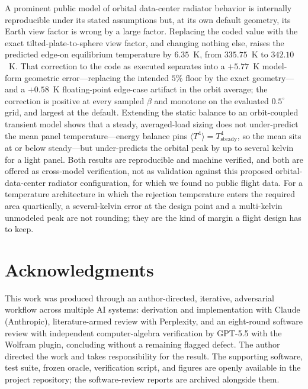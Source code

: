 \documentclass[11pt]{article}
\theoremstyle{remark}
\begin{document}
A prominent public model of orbital data-center radiator behavior is internally
reproducible under its stated assumptions but, at its own default geometry, its
Earth view factor is wrong by a large factor. Replacing the coded value with the
exact tilted-plate-to-sphere view factor, and changing nothing else, raises the
predicted edge-on equilibrium temperature by $6.35$~K, from $335.75$~K to
$342.10$~K. That correction to the code as executed separates into a $+5.77$~K
model-form geometric error---replacing the intended $5\%$ floor by the exact
geometry---and a $+0.58$~K floating-point edge-case artifact in the orbit average;
the correction is positive at every sampled $\beta$ and monotone on the evaluated
$0.5^{\circ}$ grid, and largest at the default.
Extending the static balance to an orbit-coupled transient model shows that a
steady, averaged-load sizing does not under-predict the mean panel
temperature---energy balance pins $\langle T^{4}\rangle=T_{\mathrm{steady}}^{4}$,
so the mean sits at or below steady---but under-predicts the orbital peak by up to
several kelvin for a light panel. Both results are reproducible and machine
verified, and both are offered as cross-model verification, not as validation
against this proposed orbital-data-center radiator configuration, for which we
found no public flight data. For a temperature architecture in which the rejection
temperature enters the required area quartically, a several-kelvin error at the
design point and a multi-kelvin unmodeled peak are not rounding; they are the kind
of margin a flight design has to keep.

\section*{Acknowledgments}

This work was produced through an author-directed, iterative, adversarial workflow
across multiple AI systems: derivation and implementation with Claude (Anthropic),
literature-armed review with Perplexity, and an eight-round software review with
independent computer-algebra verification by GPT-5.5 with the Wolfram plugin,
concluding without a remaining flagged defect. The author directed the work and
takes responsibility for the result. The supporting software, test suite, frozen
oracle, verification script, and figures are openly available in the project
repository; the software-review reports are archived alongside them.
\end{document}
